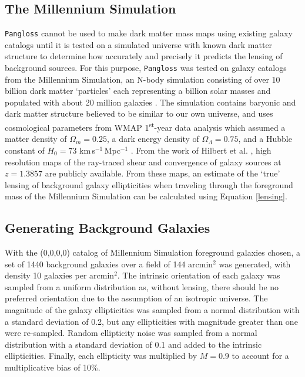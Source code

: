 \documentclass[%
 reprint,
 amsmath,amssymb,
 aps,nofootinbib
]{revtex4-1}
\begin{document}
\subsection{The Millennium Simulation} \label{ms}
\texttt{Pangloss} cannot be used to make dark matter mass maps using existing galaxy catalogs until it is tested on a simulated universe with known dark matter structure to determine how accurately and precisely it predicts the lensing of background sources. For this purpose, \texttt{Pangloss} was tested on galaxy catalogs from the Millennium Simulation, an N-body simulation consisting of over 10 billion dark matter `particles' each representing a billion solar masses and populated with about 20 million galaxies \cite{millennium_simulation}. The simulation contains baryonic and dark matter structure believed to be similar to our own universe, and uses cosmological parameters from WMAP 1\textsuperscript{st}-year data analysis which assumed a matter density of $\Omega_m=0.25$, a dark energy density of $\Omega_\Lambda=0.75$, and a Hubble constant of $H_0=73$ km$\,$s$^{-1}\,$Mpc$^{-1}$ \cite{wmap1}. From the work of Hilbert et al. \cite{ray_tracing}, high resolution maps of the ray-traced shear and convergence of galaxy sources at $z=1.3857$ are publicly available. From these maps, an estimate of the `true' lensing of background galaxy ellipticities when traveling through the foreground mass of the Millennium Simulation can be calculated using Equation \eqref{lensing}.


\subsection{Generating Background Galaxies}
With the (0,0,0,0) catalog of Millennium Simulation foreground galaxies chosen, a set of 1440 background galaxies over a field of 144 arcmin$^2$ was generated, with density 10 galaxies per arcmin$^2$. The intrinsic orientation of each galaxy was sampled from a uniform distribution as, without lensing, there should be no preferred orientation due to the assumption of an isotropic universe. The magnitude of the galaxy ellipticities was sampled from a normal distribution with a standard deviation of 0.2, but any ellipticities with magnitude greater than one were re-sampled. Random ellipticity noise was sampled from a normal distribution with a standard deviation of 0.1 and added to the intrinsic ellipticities. Finally, each ellipticity was multiplied by $M=0.9$ to account for a multiplicative bias of 10\%.
\end{document}
